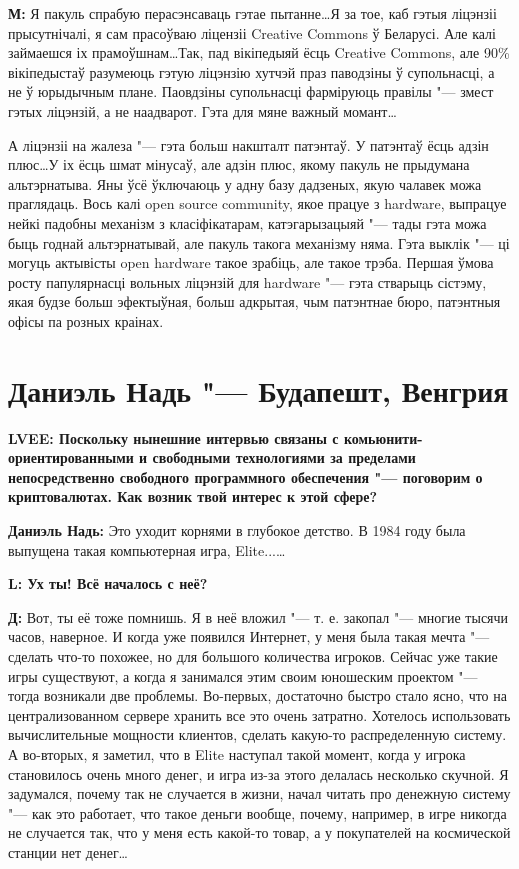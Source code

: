 \documentclass[10pt, a5paper]{article}
\begin{document}
{\noindent \bf М:} Я пакуль спрабую перасэнсаваць гэтае пытанне\ldots Я за тое, каб гэтыя ліцэнзіі прысутнічалі, я сам прасоўваю ліцензіі Creative Com\-mons ў Беларусі. Але калі займаешся іх прамоўшнам\ldots Так, пад вікіпедыяй ёсць Creatіve Commons, але 90\% вікіпедыстаў разумеюць гэтую ліцэнзію хутчэй праз паводзіны ў супольнасці, а не ў юрыдычным плане. Паовдзіны супольнасці фарміруюць правілы "--- змест гэтых ліцэнзій, а не наадварот. Гэта для мяне важный момант\ldots

А ліцэнзіі на жалеза "--- гэта больш накшталт патэнтаў. У патэнтаў ёсць адзін плюс\ldots У іх ёсць шмат мінусаў, але адзін плюс, якому пакуль не прыдумана альтэрнатыва. Яны ўсё ўключаюць у адну базу дадзеных, якую чалавек можа праглядаць. Вось калі open source community, якое працуе з hardware, выпрацуе нейкі падобны механізм з класіфікатарам, катэгарызацыяй "--- тады гэта можа быць годнай альтэрнатывай, але пакуль такога механізму няма. Гэта выклік "--- ці могуць актывісты open hardware такое зрабіць, але такое трэба. Першая ўмова росту папулярнасці вольных ліцэнзій для hardware "--- гэта стварыць сістэму, якая будзе больш эфектыўная, больш адкрытая, чым патэнтнае бюро, патэнтныя офісы па розных краінах.


\section{Даниэль Надь "---  Будапешт, Венгрия}

{\noindent \bf LVEE: Поскольку нынешние интервью связаны с комьюни\-ти-ориентированными и свободными технологиями за пределами непосредственно свободного программного обеспечения "--- поговорим о криптовалютах. Как возник твой интерес к этой сфере?}

{\noindent \bf Даниэль Надь:} Это уходит корнями в глубокое детство. В 1984 году была выпущена такая компьютерная игра, Elite...\ldots 

{\noindent \bf L: Ух ты! Всё началось с неё?}

{\noindent \bf Д:} Вот, ты её тоже помнишь. Я в неё вложил "--- т. е. закопал "--- многие тысячи часов, наверное. И когда уже появился Интернет, у меня была такая мечта "--- сделать что-то похожее, но для большого количества игроков. Сейчас уже такие игры существуют, а когда я занимался этим  своим юношеским проектом "--- тогда возникали две проблемы. Во-первых, достаточно быстро стало ясно, что на централизованном сервере хранить все это очень затратно. Хотелось использовать вычислительные мощности клиентов, сделать какую-то распределенную систему. А во-вторых, я заметил, что в Elite наступал такой момент, когда у игрока становилось очень много денег, и игра из-за этого делалась несколько скучной. Я задумался, почему так не случается в жизни, начал читать про денежную систему "--- как это работает, что такое деньги вообще, почему, например, в игре никогда не случается так, что у меня есть какой-то товар, а у покупателей на космической станции нет денег\ldots
\end{document}
